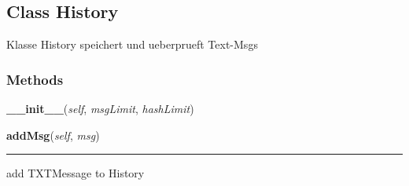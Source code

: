 
\subsection{Class History}

    \label{message:History}
Klasse History speichert und ueberprueft Text-Msgs



  \subsubsection{Methods}

    \label{message:History:__init__}

    \vspace{0.5ex}

\hspace{.8\funcindent}\begin{boxedminipage}{\funcwidth}

    \raggedright \textbf{\_\_init\_\_}(\textit{self}, \textit{msgLimit}, \textit{hashLimit})

\setlength{\parskip}{2ex}
\setlength{\parskip}{1ex}
    \end{boxedminipage}

    \label{message:History:addMsg}

    \vspace{0.5ex}

\hspace{.8\funcindent}\begin{boxedminipage}{\funcwidth}

    \raggedright \textbf{addMsg}(\textit{self}, \textit{msg})

    \vspace{-1.5ex}

    \rule{\textwidth}{0.5\fboxrule}
\setlength{\parskip}{2ex}
    add TXTMessage to History

\setlength{\parskip}{1ex}
    \end{boxedminipage}

